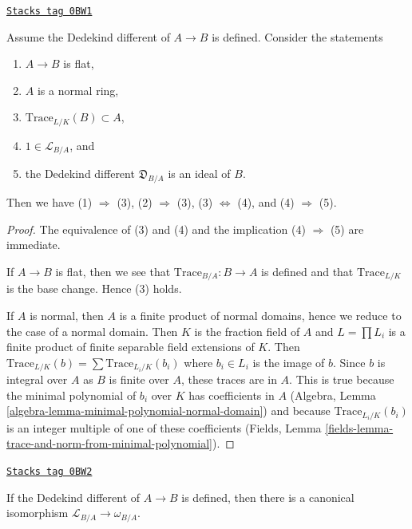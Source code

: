 \begin{lemma}
\label{discriminant-lemma-dedekind-different-ideal}
\href{https://stacks.math.columbia.edu/tag/0BW1}{\texttt{Stacks tag 0BW1}}

Assume the Dedekind different of $A \to B$ is defined. Consider the statements
\begin{enumerate}
\item $A \to B$ is flat,
\item $A$ is a normal ring,
\item $\text{Trace}_{L/K}(B) \subset A$,
\item $1 \in \mathcal{L}_{B/A}$, and
\item the Dedekind different $\mathfrak{D}_{B/A}$ is an ideal of $B$.
\end{enumerate}
Then we have (1) $\Rightarrow$ (3), (2) $\Rightarrow$ (3),
(3) $\Leftrightarrow$ (4), and (4) $\Rightarrow$ (5).
\end{lemma}

\begin{proof}
The equivalence of (3) and (4) and the
implication (4) $\Rightarrow$ (5) are immediate.

\medskip\noindent
If $A \to B$ is flat, then we see that $\text{Trace}_{B/A} : B \to A$ is
defined and that $\text{Trace}_{L/K}$ is the base change. Hence (3) holds.

\medskip\noindent
If $A$ is normal, then $A$ is a finite product of normal domains,
hence we reduce to the case of a normal domain. Then $K$ is
the fraction field of $A$ and $L = \prod L_i$ is a finite product of
finite separable field extensions of $K$. Then
$\text{Trace}_{L/K}(b) = \sum \text{Trace}_{L_i/K}(b_i)$
where $b_i \in L_i$ is the image of $b$.
Since $b$ is integral over $A$ as $B$ is finite over $A$,
these traces are in $A$. This is true because the
minimal polynomial of $b_i$ over $K$ has coefficients in $A$
(Algebra, Lemma \ref{algebra-lemma-minimal-polynomial-normal-domain})
and because $\text{Trace}_{L_i/K}(b_i)$ is an
integer multiple of one of these coefficients
(Fields, Lemma \ref{fields-lemma-trace-and-norm-from-minimal-polynomial}).
\end{proof}

\begin{lemma}
\label{discriminant-lemma-dedekind-complementary-module}
\href{https://stacks.math.columbia.edu/tag/0BW2}{\texttt{Stacks tag 0BW2}}

If the Dedekind different of $A \to B$ is defined, then
there is a canonical isomorphism
$\mathcal{L}_{B/A} \to \omega_{B/A}$.
\end{lemma}

